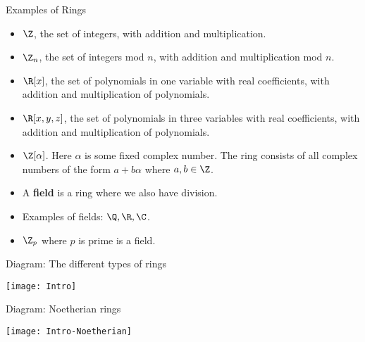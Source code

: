 \documentclass{beamer}
\begin{document}

\begin{frame}{Examples of Rings}

\begin{itemize}
  \item $\Z$, the set of integers, with addition and multiplication.
  \item $\Z_n$, the set of integers mod $n$, with addition and multiplication mod $n$.
  \item $\R[x]$, the set of polynomials in one variable with real coefficients, with addition and multiplication of polynomials.
  \item $\R[x,y,z]$, the set of polynomials in three variables with real coefficients, with addition and multiplication of polynomials.
  \item $\Z[\alpha]$. Here $\alpha$ is some fixed complex number. The ring consists of all complex numbers of the form $a+b\alpha$ where
  $a,b\in\Z$.
  \item A \textbf{field} is a ring where we also have division.
  \item Examples of fields: $\Q, \R, \C$.
  \item $\Z_p$ where $p$ is prime is a field.
\end{itemize}

\end{frame}


\begin{frame}{Diagram: The different types of rings}

\begin{center}
\texttt{[image: Intro]}
\end{center}

\end{frame}




\begin{frame}{Diagram: Noetherian rings}

\begin{center}
\texttt{[image: Intro-Noetherian]}
\end{center}

\end{frame}
\end{document}
